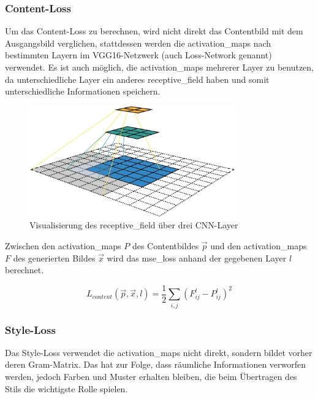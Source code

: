 \subsubsection{Content-Loss}
\label{sec:content_loss}

Um das Content-Loss zu berechnen, wird nicht direkt das Contentbild mit dem Ausgangsbild verglichen, stattdessen werden die \gls{activation_map}s nach bestimmten Layern im VGG16-Netzwerk (auch Loss-Network genannt) verwendet. Es ist auch möglich, die \gls{activation_map}s mehrerer Layer zu benutzen, da unterschiedliche Layer ein anderes \gls{receptive_field} haben und somit unterschiedliche Informationen speichern.

\begin{figure}[H]
	\centering
	\includegraphics[width=0.79\textwidth]{resources/content/receptive_field.png}
	\caption{Visualisierung des \gls{receptive_field} über drei CNN-Layer \cite{receptive_field_img}}
	\label{img:receptive_field_img}
\end{figure}

Zwischen den \gls{activation_map}s $ P $  des Contentbildes $ \vec{p} $ und den \gls{activation_map}s $ F $ des generierten Bildes $ \vec{x} $ wird das \gls{mse_loss} anhand der gegebenen Layer $ l $ berechnet.

\begin{equation}
	\label{eq:content_loss}
    L_{content} ( \vec{p}, \vec{x}, l ) = \frac{1}{2} \sum_{i, j} (F_{ij}^{l} - P_{ij}^{l})^2
\end{equation}

\subsubsection{Style-Loss}
\label{sec:style_loss}

Das Style-Loss verwendet die \gls{activation_map}s nicht direkt, sondern bildet vorher deren Gram-Matrix. Das hat zur Folge, dass räumliche Informationen verworfen werden, jedoch Farben und Muster erhalten bleiben, die beim Übertragen des Stils die wichtigste Rolle spielen.

